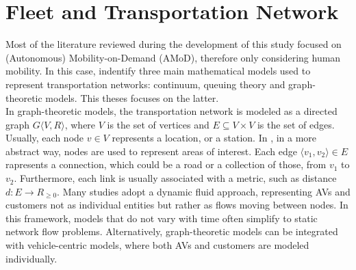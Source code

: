 \section{Fleet and Transportation Network}\label{sec:model_systems}
Most of the literature reviewed during the development of this study focused on (Autonomous) Mobility-on-Demand (AMoD), therefore only considering human mobility.%
In this case,  indentify three main mathematical models used to represent transportation networks: continuum, queuing theory and graph-theoretic models. This theses focuses on the latter. \\
In graph-theoretic models, the transportation network is modeled as a directed graph $G  \langle V, R\rangle$, where $V$ is the set of vertices and $E\subseteq  V \times V$ is the set of edges. Usually, each node $v \in V$ represents a location, or a station. In \cite{project_thesis}, in a more abstract way, nodes are used to represent areas of interest. Each edge $\langle v_1, v_2\rangle \in E$ rapresents a connection, which could be a road or a collection of those, from $v_1$ to $v_2$. Furthermore, each link is usually associated with a metric, such as distance $d : E \rightarrow R_{\ge0}$.  Many studies adopt a dynamic fluid approach, representing AVs and customers not as individual entities but rather as flows moving between nodes. In this framework, models that do not vary with time often simplify to static network flow problems. Alternatively, graph-theoretic models can be integrated with vehicle-centric models, where both AVs and customers are modeled individually.
